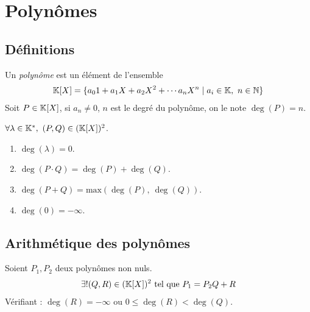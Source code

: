 \chapter{Polynômes}

\section{Définitions}
\begin{definition}[Polynôme]
    Un \emph{polynôme} est un élément de l'ensemble 
    \begin{align*}
        \mathbb{K}[X] = \{ a_0 1 + a_1 X + a_2 X^2 + \cdots a_n X^n \mid a_i \in \mathbb{K},\ n \in \mathbb{N} \}
    \end{align*}
    Soit $P \in \mathbb{K}[X]$, si $a_n \neq 0$, $n$ est le degré du polynôme, on le note 
    $ \deg(P) = n. $
\end{definition}

\begin{proposition}
	$\forall \lambda \in \mathbb{K}^*,\ (P, Q) \in (\mathbb{K}[X])^2$. 
	\begin{multicols}{2}
        \begin{enumerate}
    		\item $\operatorname{deg}(\lambda) = 0$.
    		\item $\operatorname{deg}(P \cdot Q) = \operatorname{deg}(P) + \operatorname{deg}(Q)$.
    		\item $\operatorname{deg}(P + Q) = \mathrm{max}\left(\operatorname{deg}(P),\ \operatorname{deg}(Q)\right)$.
            \item $\operatorname{deg}(0) = -\infty$.
    	\end{enumerate}
    \end{multicols}
\end{proposition}

\section{Arithmétique des polynômes}

\begin{theorem}
	Soient $P_1, P_2$ deux polynômes non nuls.
	\begin{align*}
		\exists ! (Q, R) \in (\mathbb{K}[X])^2 \text{ tel que } P_1 = P_2 Q + R 
	\end{align*}
	Vérifiant :
	$\operatorname{deg}(R) = -\infty$ ou $0 \leq \operatorname{deg}(R) < \operatorname{deg}(Q)$.
\end{theorem}

